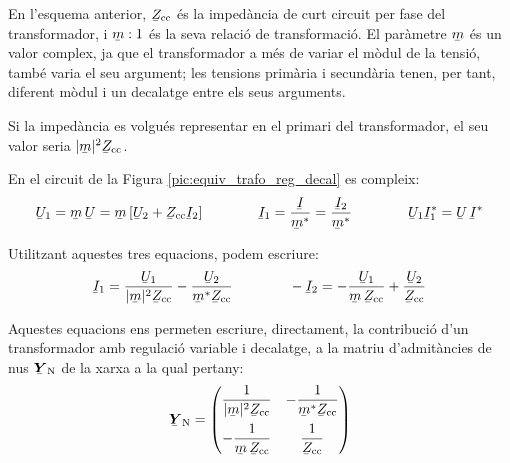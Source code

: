 En l'esquema anterior, $\cmplx{Z}\ped{cc}$ \'{e}s la imped\`{a}ncia de curt
circuit per fase del transformador, i $\cmplx{m} : 1$ \'{e}s la seva
relaci\'{o} de transformaci\'{o}. El par\`{a}metre $\cmplx{m}$ \'{e}s un valor
complex, ja que el transformador a m\'{e}s de variar el m\`{o}dul de la
tensi\'{o}, tamb\'{e} varia  el seu argument; les tensions prim\`{a}ria i
secund\`{a}ria tenen, per tant,  diferent m\`{o}dul i un decalatge entre els
seus arguments.

Si la imped\`{a}ncia es volgu\'{e}s representar en el primari del
transformador, el seu valor seria $|\cmplx{m}|^2 \cmplx{Z}\ped{cc}$.

En el circuit de la Figura \vref{pic:equiv_trafo_reg_decal} es
compleix: 
\begin{equation}
   \cmplx{U}_1 = \cmplx{m} \,\cmplx{U} = \cmplx{m}\,
   [\cmplx{U}_2+\cmplx{Z}\ped{cc}\cmplx{I}_2]
   \qquad\qquad
   \cmplx{I}_1 = \frac{\cmplx{I}}{\cmplx{m}^*} = \frac{\cmplx{I}_2}{\cmplx{m}^*}
   \qquad\qquad
   \cmplx{U}_1 \cmplx{I}_1^* = \cmplx{U} \,\cmplx{I}^*
\end{equation}

Utilitzant aquestes tres equacions, podem escriure:
\begin{equation}
   \cmplx{I}_1 = \frac{\cmplx{U}_1}{|\cmplx{m}|^2 \cmplx{Z}\ped{cc}} - \frac{\cmplx{U}_2}
   {\cmplx{m}^* \cmplx{Z}\ped{cc}} \qquad\qquad
   - \cmplx{I}_2 = - \frac{\cmplx{U}_1}{\cmplx{m} \,\cmplx{Z}\ped{cc}} + \frac{\cmplx{U}_2}
   {\cmplx{Z}\ped{cc}}
\end{equation}

Aquestes equacions ens permeten escriure, directament, la
contribuci\'{o} d'un transformador amb regulaci\'{o} variable i decalatge, a
la matriu d'admit\`{a}ncies de nus $\mcmplx{Y}\ped{N}$ de la xarxa a la
qual pertany: 
\begin{equation} \label{eq:yn_trafo_reg_decal}
   \mcmplx{Y}\ped{N} = \begin{pmatrix}
     \dfrac{1}{|\cmplx{m}|^2 \cmplx{Z}\ped{cc}} & - \dfrac{1}
   {\cmplx{m}^* \cmplx{Z}\ped{cc}} \\[2.5ex]
     - \dfrac{1}{\cmplx{m} \,\cmplx{Z}\ped{cc}} & \dfrac{1}
   {\cmplx{Z}\ped{cc}}
   \end{pmatrix}
\end{equation}

